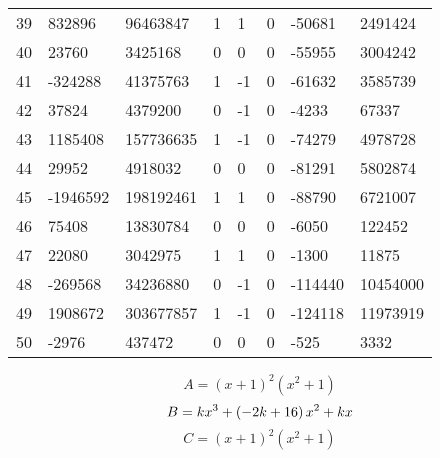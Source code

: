 \documentclass{amsart}
\begin{document}
\begin{longtable}{|l|l|l|lllll|}
39&832896&96463847&1&1&0&-50681&2491424\\
40&23760&3425168&0&0&0&-55955&3004242\\
41&-324288&41375763&1&-1&0&-61632&3585739\\
42&37824&4379200&0&-1&0&-4233&67337\\
43&1185408&157736635&1&-1&0&-74279&4978728\\
44&29952&4918032&0&0&0&-81291&5802874\\
45&-1946592&198192461&1&1&0&-88790&6721007\\
46&75408&13830784&0&0&0&-6050&122452\\
47&22080&3042975&1&1&0&-1300&11875\\
48&-269568&34236880&0&-1&0&-114440&10454000\\
49&1908672&303677857&1&-1&0&-124118&11973919\\
50&-2976&437472&0&0&0&-525&3332\\
\hline
\end{longtable}
$$A=(x
 + 1)^{2}(x^2
 + 1)$$
$$B=k\*x^3
 + \left(-2\*k
 + 16\right) \*x^2
 + k\*x$$
$$C=(x
 + 1)^{2}(x^2
 + 1)$$
\end{document}
